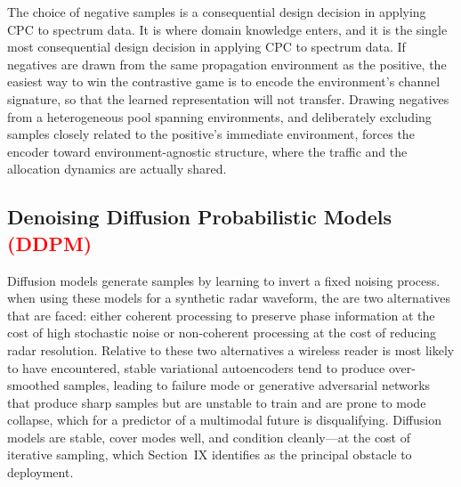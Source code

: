 \documentclass[lettersize,journal]{IEEEtran}
\newcommand{\red}[1]{\textcolor{red}{#1}}
\begin{document}
The choice of negative samples is a consequential design decision in applying
CPC to spectrum data.
It is where domain knowledge enters, and it is the
single most consequential design decision in applying CPC to spectrum
data.
If negatives are drawn from the same propagation environment as
the positive, the easiest way to win the contrastive game is to encode
the environment's channel signature, so that the learned representation will
not transfer.
Drawing negatives from a heterogeneous pool spanning
environments, and deliberately excluding samples closely related to the
positive's immediate environment, forces the encoder toward
environment-agnostic structure, where the traffic and the allocation dynamics
 are actually shared.

\subsection{\textbf{Denoising Diffusion Probabilistic Models \red{(DDPM)}}}
Diffusion models \cite{SohlDickstein2015, Ho2020} generate samples 
by learning to invert a fixed noising process.
when using these models for a synthetic radar waveform, 
the are two alternatives that are faced: either coherent processing to 
preserve phase information at the cost of high stochastic noise or
non-coherent processing at the cost of reducing radar resolution.
 Relative to these two alternatives a wireless reader is most likely to
have encountered, stable variational autoencoders
\cite{Kingma2014} tend to produce over-smoothed samples,
leading to failure mode or generative
adversarial networks \cite{Goodfellow2014} that produce sharp samples but are
unstable to train and are prone to mode collapse, which for a predictor of a
multimodal future is disqualifying.
Diffusion models are stable, cover modes well,
and condition cleanly---at the cost of iterative sampling, which
Section~IX identifies as the principal obstacle to deployment.

\end{document}
